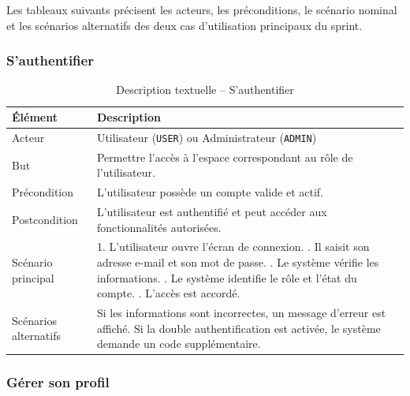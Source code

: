 Les tableaux suivants précisent les acteurs, les préconditions, le
scénario nominal et les scénarios alternatifs des deux cas
d'utilisation principaux du sprint.

\subsubsection{S'authentifier}
\label{subsubsec:desc_auth_sprint2}

\begin{table}[htbp]
\centering
\caption{Description textuelle -- S'authentifier}
\label{tab:uc_auth_sprint2}
\renewcommand{\arraystretch}{1.3}
\begin{tabular}{|p{3.1cm}|p{10.6cm}|}
\hline
\textbf{Élément} & \textbf{Description} \\
\hline
Acteur & Utilisateur (\texttt{USER}) ou Administrateur (\texttt{ADMIN}) \\
\hline
But & Permettre l'accès à l'espace correspondant au rôle de l'utilisateur. \\
\hline
Précondition & L'utilisateur possède un compte valide et actif. \\
\hline
Postcondition & L'utilisateur est authentifié et peut accéder aux fonctionnalités autorisées. \\
\hline
Scénario principal &
1. L'utilisateur ouvre l'écran de connexion. \newline
2. Il saisit son adresse e-mail et son mot de passe. \newline
3. Le système vérifie les informations. \newline
4. Le système identifie le rôle et l'état du compte. \newline
5. L'accès est accordé. \\
\hline
Scénarios alternatifs & Si les informations sont incorrectes, un message d'erreur est affiché. Si la double authentification est activée, le système demande un code supplémentaire. \\
\hline
\end{tabular}
\end{table}

\subsubsection{Gérer son profil}
\label{subsubsec:desc_profil_sprint2}

